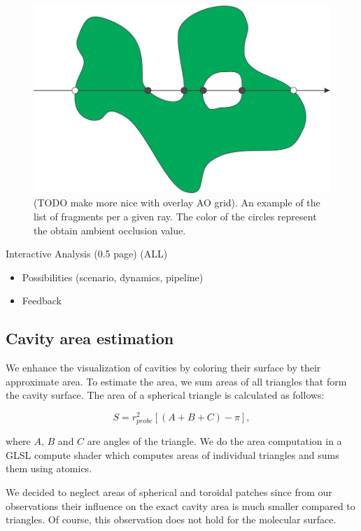 \begin{figure}[htb]
\centering
  \includegraphics[width=0.8\columnwidth]{image/ray_fragments.png}
  \caption{(TODO make more nice with overlay AO grid). An example of the list of fragments per a given ray. The color of the circles represent the obtain ambient occlusion value.}
	\label{fig:ray_fragments}
\end{figure}

Interactive Analysis (0.5 page) (ALL)
\begin{itemize}
  \item Possibilities (scenario, dynamics, pipeline)
  \item Feedback
\end{itemize}

\subsection{Cavity area estimation}

We enhance the visualization of cavities by coloring their surface by their approximate area.
To estimate the area, we sum areas of all triangles that form the cavity surface.
The area of a spherical triangle is calculated as follows:

\begin{equation}
  S = r_{probe}^2 \left[ \left( A + B + C \right) - \pi \right],
\end{equation}

where $A$, $B$ and $C$ are angles of the triangle. We do the area computation in a GLSL compute shader which computes areas of individual triangles and sums them using atomics.

We decided to neglect areas of spherical and toroidal patches since from our observations their influence on the exact cavity area is much smaller compared to triangles.
Of course, this observation does not hold for the molecular surface.
